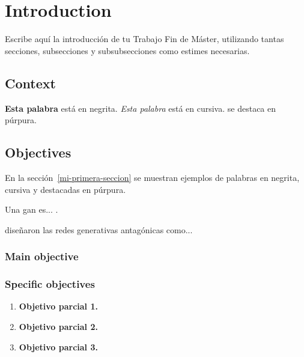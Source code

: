
\cleardoublepage

\chapter{Introduction}
\label{introduction}

Escribe aquí la introducción de tu Trabajo Fin de Máster, utilizando tantas secciones, subsecciones y subsubsecciones como estimes necesarias.

\section{Context}
\label{context}

\textbf{Esta palabra} está en negrita. \textit{Esta palabra} está en cursiva.  se destaca en púrpura.
\medskip

\section{Objectives}
\label{objectives}

En la sección~\ref{mi-primera-seccion} se muestran ejemplos de palabras en negrita, cursiva y destacadas en púrpura.
\medskip

Una \acrfull{gan} es... \citep{goodfellow2014generative}.
\medskip

\citet{goodfellow2014generative} diseñaron las redes generativas antagónicas como...
\medskip

\vspace{5ex}

\subsection{Main objective}
\label{main-objective}

\subsection{Specific objectives}
\label{specific-objectives}

\begin{enumerate}[label=\destacado{\arabic*.}]
  \setlength\itemsep{1em}
  \item \textbf{Objetivo parcial 1.}

  \item \textbf{Objetivo parcial 2.}

  \item \textbf{Objetivo parcial 3.}
\end{enumerate}

\newpage